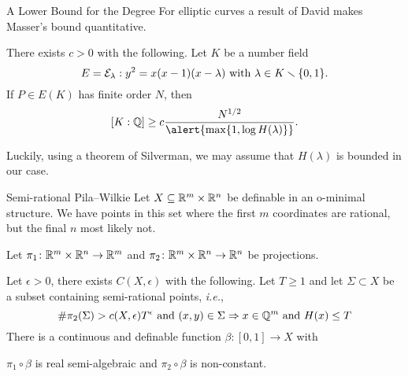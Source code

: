 \documentclass{beamer}
\begin{document}
\begin{frame}{A Lower Bound for the Degree}
  For elliptic curves a result of David makes Masser's bound quantitative.
  
  \begin{theorem}[David]
    There exists $c>0$ with the following. 
    Let $K$ be a number field
    $$E={\mathcal E}_\lambda: y^2=x(x-1)(x-\lambda)    \text{ with }
    \lambda\in K\smallsetminus\{0,1\}.$$
    If $P\in
    E(K)$ has finite order $N$, then
    \begin{equation}
      \label{eq:davidKQlb}
      [K:\IQ] \ge c \frac{N^{1/2}}{\alert{\max\{1,\log H(\lambda)\}}}.
    \end{equation}    
  \end{theorem}

  Luckily, using a theorem of \alert{Silverman}, we may assume that
  $H(\lambda)$ is bounded in our case.
  

\end{frame}


\begin{frame}{Semi-rational Pila--Wilkie}
  Let $X\subseteq {\mathbb{R}}^m\times{\mathbb{R}}^n$
  be definable in an o-minimal structure. 
  We have points in this set where the
  first $m$ coordinates are rational, but the final $n$ most likely not.

  Let $\pi_1\colon{\mathbb{R}}^m\times{\mathbb{R}}^n\rightarrow{\mathbb{R}}^m$ and
  $\pi_2\colon{\mathbb{R}}^m\times{\mathbb{R}}^n\rightarrow{\mathbb{R}}^n$ be projections.

  \begin{theorem}
    Let $\epsilon>0$, there exists $C(X,\epsilon)$ with the following. 
    Let $T\ge 1$ and let $\Sigma\subset X$ be a subset containing
    \alert{semi-rational points}, \textit{i.e.},
    $$
    \#\pi_2(\Sigma) > c(X,\epsilon) T^\epsilon \text{ and }
    (x,y)\in\Sigma\Rightarrow x\in {\mathbb{Q}}^m \text{ and }H(x)\le T
    $$  
    There is a continuous and definable function $\beta\colon
    [0,1]\rightarrow X$ with
    \begin{center}
      $\pi_1\circ\beta$ is real semi-algebraic and
      $\pi_2\circ\beta$ is non-constant.  
    \end{center}  
  \end{theorem}
\end{frame}
\end{document}
